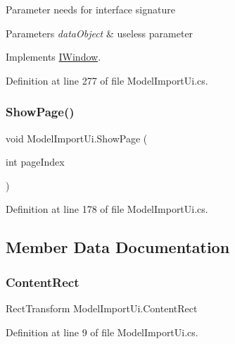 Parameter needs for interface signature 


\begin{DoxyParams}{Parameters}
{\em data\+Object} & useless parameter\\
\hline
\end{DoxyParams}


Implements \mbox{\hyperlink{interface_i_window_aba12a3c53948d87aef07aed93b225aa9}{I\+Window}}.



Definition at line 277 of file Model\+Import\+Ui.\+cs.

\mbox{\label{class_model_import_ui_ab3f81f6357a8a955ab08082ee631b62f}} 
\subsubsection{\texorpdfstring{ShowPage()}{ShowPage()}}
{\footnotesize\ttfamily void Model\+Import\+Ui.\+Show\+Page (\begin{DoxyParamCaption}\item[{int}]{page\+Index }\end{DoxyParamCaption})}



Definition at line 178 of file Model\+Import\+Ui.\+cs.



\subsection{Member Data Documentation}
\mbox{\label{class_model_import_ui_a5b275d728820d77f486a8bfe7b3dc3f2}} 
\subsubsection{\texorpdfstring{ContentRect}{ContentRect}}
{\footnotesize\ttfamily Rect\+Transform Model\+Import\+Ui.\+Content\+Rect}



Definition at line 9 of file Model\+Import\+Ui.\+cs.

\mbox{\label{class_model_import_ui_a055ff2f78dafbee19346bb8b393f223a}} 
